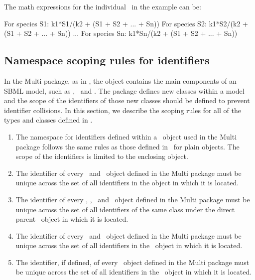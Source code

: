 The math expressions for the individual \species\ in the example can be:

\begin{example}[style=latex]
For species S1:    k1*S1/(k2 + (S1 + S2 + ... + Sn)) 
For species S2:    k1*S2/(k2 + (S1 + S2 + ... + Sn)) 
...
For species Sn:    k1*Sn/(k2 + (S1 + S2 + ... + Sn)) 
\end{example}


\subsection{Namespace scoping rules for identifiers}
\label{def:namespaces_scoping_rules}

In the Multi package, as in \SbmlLevelThreeVersionOneCore,
the \Model object contains the main components of an
SBML model, such as \species, \compartments\ and \reactions.  The
package defines new classes within a model and the scope of the identifiers of 
those new classes should be defined to prevent identifier collisions. In this section, we
describe the scoping rules for all of the types and classes defined in
.

\begin{enumerate}

\item The namespace for  identifiers defined within 
  a \ExModel\ object used in the Multi package follows the
  same rules as those defined in \SbmlLevelThreeVersionOneCore\ for plain \Model
  objects. The scope of the identifiers is limited to the enclosing
  \ExModel object.  
  
\item The identifier of every \SpeciesType\ and \PossibleSpeciesFeatureValue\ object defined in the Multi package must be unique
  across the set of all identifiers in the  object in which it is located. 

\item The identifier of every \SpeciesTypeInstance, \SpeciesTypeComponentIndex,
  \InSpeciesTypeBond\ and \SpeciesFeatureType\ object defined in the Multi package must be unique
  across the set of all identifiers of the same class under the direct parent \SpeciesType\ object in which it is located. 

\item The identifier of every \SpeciesFeature\ and \SubListOfSpeciesFeatures\ object defined in the Multi package must be unique
  across the set of all identifiers in the \ExSpecies\ object in which it is located. 
  
\item The identifier, if defined, of every \CompartmentReference\ object defined in the Multi package must be unique
  across the set of all identifiers in the \ExCompartment\ object in which it is located. 

\end{enumerate}




